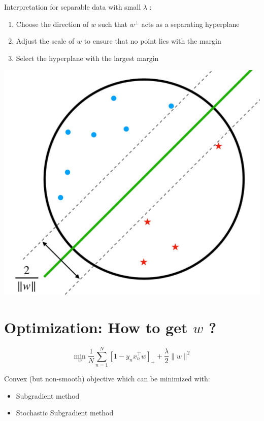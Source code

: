 \documentclass[10pt]{article}
\begin{document}
Interpretation for separable data with small $\lambda$ :

\begin{enumerate}
  \item Choose the direction of $w$ such that $w^{\perp}$ acts as a separating hyperplane

  \item Adjust the scale of $w$ to ensure that no point lies with the margin

  \item Select the hyperplane with the largest margin

\end{enumerate}

\begin{center}
\includegraphics[max width=\textwidth]{2023_12_30_bf5d191916c1e78fa6d6g-13}
\end{center}

\section*{Optimization: How to get $w$ ?}
$$
\min _{w} \frac{1}{N} \sum_{n=1}^{N}\left[1-y_{n} x_{n}^{\top} w\right]_{+}+\frac{\lambda}{2}\|w\|^{2}
$$

Convex (but non-smooth) objective which can be minimized with:

\begin{itemize}
  \item Subgradient method
  \item Stochastic Subgradient method
\end{itemize}
\end{document}
